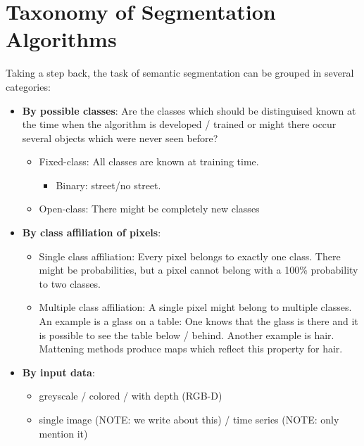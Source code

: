 \section{Taxonomy of Segmentation Algorithms}\label{sec:taxonomy}
Taking a step back, the task of semantic segmentation can be grouped in several
categories:

\begin{itemize}
    \item \textbf{By possible classes}: Are the classes which should be distinguised
          known at the time when the algorithm is developed / trained or might
          there occur several objects which were never seen before?
          \begin{itemize}
              \item Fixed-class: All classes are known at training time.
                    \begin{itemize}
                        \item Binary: street/no street.
                    \end{itemize}
              \item Open-class: There might be completely new classes
          \end{itemize}
    \item \textbf{By class affiliation of pixels}:
          \begin{itemize}
              \item Single class affiliation: Every pixel belongs to exactly one class. There might
                    be probabilities, but a pixel cannot belong with a 100\%
                    probability to two classes.
              \item Multiple class affiliation: A single pixel might belong to
                    multiple classes. An example is a glass on a table: One
                    knows that the glass is there and it is possible to see the
                    table below / behind. Another example is hair. Mattening
                    methods produce maps which reflect this property for hair.\cite{levin2008spectral}
          \end{itemize}
    \item \textbf{By input data}:
          \begin{itemize}
              \item greyscale / colored / with depth (RGB-D)
              \item single image (NOTE: we write about this) / time series (NOTE: only mention it)

\end{itemize}
\end{itemize}
